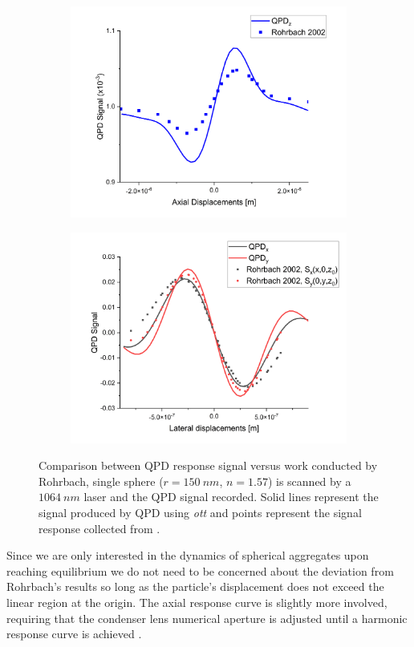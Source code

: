 \begin{figure}[h]
	\label{fig:Rohrbach}
	\begin{subfigure}{0.475 \linewidth}
		\subcaption{}
		\includegraphics[width=\linewidth]{QPD_axial_tests.png}
	\end{subfigure}
	\begin{subfigure}{0.475 \linewidth}
		\subcaption{}
		\includegraphics[width=\linewidth]{QPD_lat_tests.png}
	\end{subfigure}
	\caption{Comparison between QPD response signal versus work conducted by Rohrbach, single sphere ($r = 150\ nm$, $n=1.57$) is scanned by a $1064\ nm$ laser and the QPD signal recorded. Solid lines represent the signal produced by QPD using \textit{ott} and points represent the signal response collected from \cite{Rohrbach2002}.}
\end{figure}
Since we are only interested in the dynamics of spherical aggregates upon reaching equilibrium we do not need to be concerned about the deviation from Rohrbach's results so long as the particle's displacement does not exceed the linear region at the origin. The axial response curve is slightly more involved, requiring that the condenser lens numerical aperture is adjusted until a harmonic response curve is achieved \cite{Friedrich2012}. 

